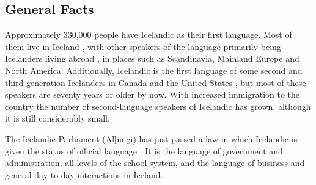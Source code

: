 
\begin{multicols}{2}

\subsection{General Facts}

Approximately 330,000 people have Icelandic as their first language. Most of them live in Iceland \cite{hag1},  with other speakers of the language primarily being Icelanders living abroad \cite{vis1},  in places such as Scandinavia, Mainland Europe and North America. Additionally, Icelandic is the first language of some second and third generation Icelanders in Canada and the United States \cite{can1},  but most of these speakers are seventy years or older by now. With increased immigration to the country the number of second-language speakers of Icelandic has grown, although it is still considerably small. 


The Icelandic Parliament (Alþingi) has just passed a law in which Icelandic is given the status of official language \cite{alt1}.  It is the language of government and administration, all levels of the school system, and the language of business and general day-to-day interactions in Iceland.


\end{multicols}
